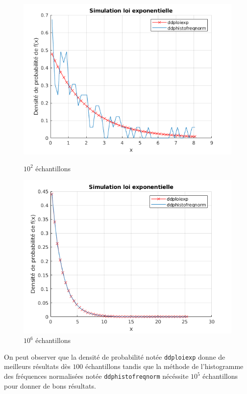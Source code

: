 \documentclass[a4paper,oneside]{article}
\begin{document}
 \begin{figure}[h!]
\centering
    \begin{minipage}[c]{.46\linewidth}
        \centering
        \includegraphics[scale=0.5]{../Exercice3/Part2N=100.png}
        \caption{$10^2$ échantillons}
    \end{minipage}
    \hfill%
    \begin{minipage}[c]{.46\linewidth}
        \centering
        \includegraphics[scale=0.5]{../Exercice3/Part2N=100000.png}
        \caption{$10^6$ échantillons}
    \end{minipage}
\end{figure}

On peut observer que la densité de probabilité notée \verb?ddploiexp? donne de meilleurs résultats dès $100$ échantillons tandis que la méthode de l'histogramme des fréquences normalisées notée \verb?ddphistofreqnorm? nécéssite $10^5$ échantillons pour donner de bons résultats.
\end{document}
